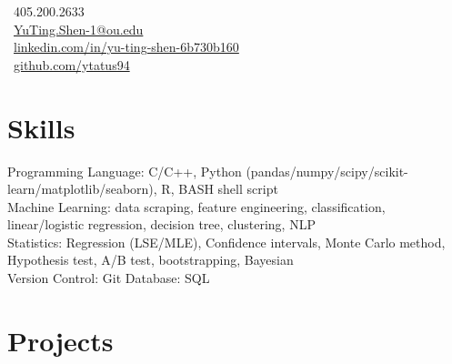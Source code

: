 \documentclass[letterpaper]{deedy-resume-openfont}
\begin{document}
%
%
\lastupdated

%
%

{
    \faPhone \ 405.200.2633\\
    \faEnvelope \ \href{mailto:YuTing.Shen-1@ou.edu}{YuTing.Shen-1@ou.edu}\\
    \faLinkedinSquare \ \href{https://www.linkedin.com/in/yu-ting-shen-6b730b160/}{linkedin.com/in/yu-ting-shen-6b730b160}\\
    \faGithub \ \href{https://github.com/ytatus94}{github.com/ytatus94}
}




\section{Skills}

\raggedright{
    Programming Language:
    C/C++, Python (pandas/numpy/scipy/scikit-learn/matplotlib/seaborn), R, BASH shell script\\
    Machine Learning: data scraping, feature engineering, classification, linear/logistic regression, decision tree, clustering, NLP\\
    Statistics:
    Regression (LSE/MLE), Confidence intervals, Monte Carlo method, Hypothesis test, A/B test, bootstrapping, Bayesian\\
    Version Control:
    Git
    \textbullet{}
    Database:
    SQL\\
}
\sectionsep


\section{Projects}

\end{document}
